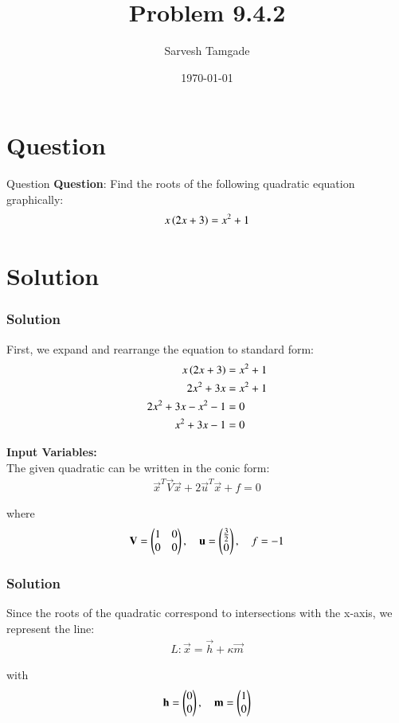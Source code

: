 \documentclass{beamer}
\title{Problem 9.4.2}
\author{Sarvesh Tamgade}
\date{\today}
\numberwithin{equation}{section}
\begin{document}
\begin{frame}
\titlepage
\end{frame}

\section{Question}
\begin{frame}{Question}
\textbf{Question}:
Find the roots of the following quadratic equation graphically:
 \begin{align}
  x\left(2x + 3\right) = x^2 + 1
 \end{align}


\end{frame}

\section{Solution}
\begin{frame}[fragile]
    \frametitle{Solution}
First, we expand and rearrange the equation to standard form:
\begin{align}
x\left(2x + 3\right) &= x^2 + 1\\
2x^2 + 3x &= x^2 + 1\\
2x^2 + 3x - x^2 - 1 &= 0\\
x^2 + 3x - 1 &= 0
\end{align}

\textbf{Input Variables:  }\\
The given quadratic can be written in the conic form:
\begin{align}
\vec{x}^T\vec{V}\vec{x} + 2\vec{u}^T\vec{x} + f = 0
\end{align}

where
\begin{align}
\mathbf{V} = \begin{pmatrix}1 & 0 \\ 0 & 0\end{pmatrix}, \quad \mathbf{u} = \begin{pmatrix}\frac{3}{2} \\ 0\end{pmatrix}, \quad f = -1
\end{align}

\end{frame}
\begin{frame}[fragile]
    \frametitle{Solution}
Since the roots of the quadratic correspond to intersections with the x-axis, we represent the line:
\begin{align}
L: \vec{x} = \vec{h} + \kappa\vec{m}
\end{align}

with
\begin{align}
\mathbf{h} = \begin{pmatrix}0 \\ 0\end{pmatrix}, \quad \mathbf{m} = \begin{pmatrix}1 \\ 0\end{pmatrix}
\end{align}

\end{frame}
\end{document}
